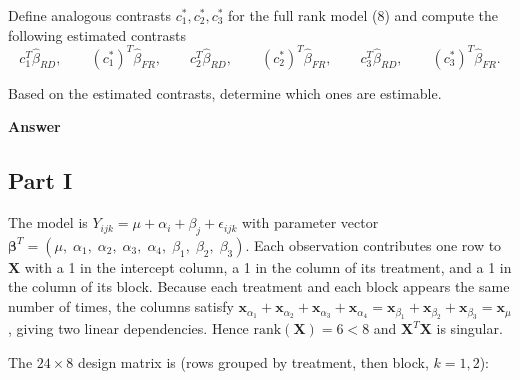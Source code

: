 \documentclass[letterpaper]{article}
\begin{document}
\begin{enumerate}
			Define analogous contrasts $c_1^*,c_2^*,c_3^*$ for the full rank model (8) and compute the following estimated contrasts
			\[
			c_1^T\hat{\beta}_{RD},
			\qquad
			(c_1^*)^T\hat{\beta}_{FR},
			\qquad
			c_2^T\hat{\beta}_{RD},
			\qquad
			(c_2^*)^T\hat{\beta}_{FR},
			\qquad
			c_3^T\hat{\beta}_{RD},
			\qquad
			(c_3^*)^T\hat{\beta}_{FR}.
			\]
			
			Based on the estimated contrasts, determine which ones are estimable.
		\end{enumerate}
		
		\textbf{Answer}
		
	
		\subsection{Part I}
				
				The model is $Y_{ijk} = \mu + \alpha_i + \beta_j + \epsilon_{ijk}$ with
				parameter vector
				$\boldsymbol{\beta}^T = (\mu,\;\alpha_1,\;\alpha_2,\;\alpha_3,\;\alpha_4,\;\beta_1,\;\beta_2,\;\beta_3)$.
				Each observation contributes one row to $\mathbf{X}$ with a 1 in the
				intercept column, a 1 in the column of its treatment, and a 1 in the
				column of its block. Because each treatment and each block appears the
				same number of times, the columns satisfy
				$\mathbf{x}_{\alpha_1}+\mathbf{x}_{\alpha_2}+\mathbf{x}_{\alpha_3}+\mathbf{x}_{\alpha_4}
				= \mathbf{x}_{\beta_1}+\mathbf{x}_{\beta_2}+\mathbf{x}_{\beta_3}
				= \mathbf{x}_{\mu}$,
				giving two linear dependencies. Hence $\text{rank}(\mathbf{X})=6<8$
				and $\mathbf{X}^T\mathbf{X}$ is singular.
				
				The $24\times8$ design matrix is (rows grouped by treatment, then block,
				$k=1,2$):
				
\end{document}
